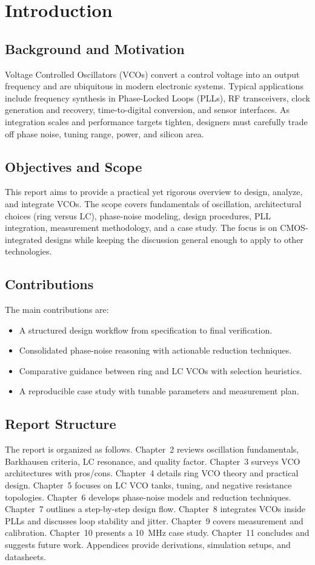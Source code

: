\chapter{Introduction}
\section{Background and Motivation}
Voltage Controlled Oscillators (VCOs) convert a control voltage into an output frequency and are ubiquitous in modern electronic systems. Typical applications include frequency synthesis in Phase-Locked Loops (PLLs), RF transceivers, clock generation and recovery, time-to-digital conversion, and sensor interfaces. As integration scales and performance targets tighten, designers must carefully trade off phase noise, tuning range, power, and silicon area.

\section{Objectives and Scope}
This report aims to provide a practical yet rigorous overview to design, analyze, and integrate VCOs. The scope covers fundamentals of oscillation, architectural choices (ring versus LC), phase-noise modeling, design procedures, PLL integration, measurement methodology, and a case study. The focus is on CMOS-integrated designs while keeping the discussion general enough to apply to other technologies.

\section{Contributions}
The main contributions are:
\begin{itemize}
  \item A structured design workflow from specification to final verification.
  \item Consolidated phase-noise reasoning with actionable reduction techniques.
  \item Comparative guidance between ring and LC VCOs with selection heuristics.
  \item A reproducible case study with tunable parameters and measurement plan.
\end{itemize}

\section{Report Structure}
The report is organized as follows. Chapter~2 reviews oscillation fundamentals, Barkhausen criteria, LC resonance, and quality factor. Chapter~3 surveys VCO architectures with pros/cons. Chapter~4 details ring VCO theory and practical design. Chapter~5 focuses on LC VCO tanks, tuning, and negative resistance topologies. Chapter~6 develops phase-noise models and reduction techniques. Chapter~7 outlines a step-by-step design flow. Chapter~8 integrates VCOs inside PLLs and discusses loop stability and jitter. Chapter~9 covers measurement and calibration. Chapter~10 presents a 10~MHz case study. Chapter~11 concludes and suggests future work. Appendices provide derivations, simulation setups, and datasheets.

